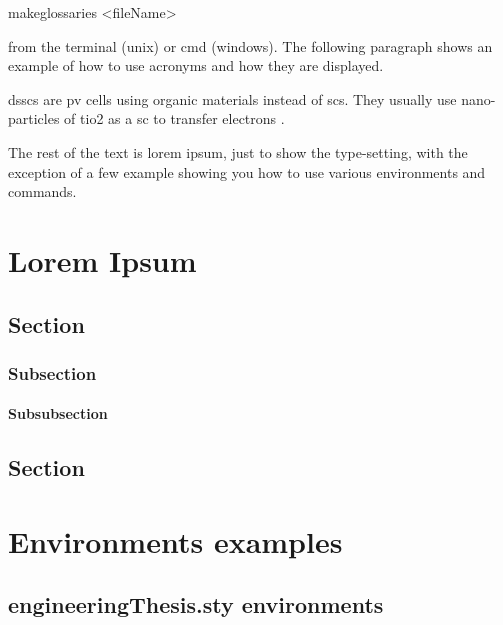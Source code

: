 \begin{code}
makeglossaries <fileName>
\end{code}

from the terminal (unix) or cmd (windows). The following paragraph shows an example of how to use acronyms and how they are displayed.

\glspl{dssc} are \gls{pv} cells using organic materials instead of \glspl{sc}. They usually use nano-particles of \gls{tio2} as a \gls{sc} to transfer electrons \cite{Gra91}.

The rest of the text is lorem ipsum, just to show the type-setting, with the exception of a few example showing you how to use various environments and commands.


\chapter{Lorem Ipsum}

\lipsum[2]

\section{Section}

\lipsum[1-4]

\subsection{Subsection}

\lipsum[1]

\subsubsection{Subsubsection}

\lipsum[1-3]

\section{Section}

\lipsum[1-2]

\chapter{Environments examples}

\section{engineeringThesis.sty environments}

